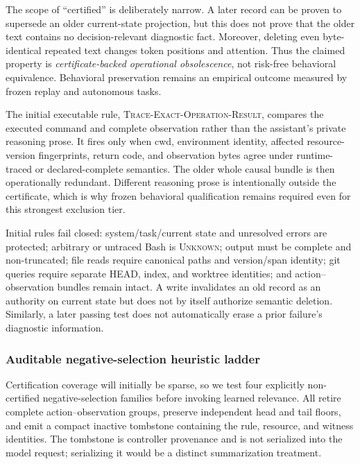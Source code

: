 \documentclass[11pt]{article}
\begin{document}
The scope of ``certified'' is deliberately narrow. A later record can be proven
to supersede an older current-state projection, but this does not prove that the
older text contains no decision-relevant diagnostic fact. Moreover, deleting
even byte-identical repeated text changes token positions and attention. Thus
the claimed property is \emph{certificate-backed operational obsolescence},
not risk-free behavioral equivalence. Behavioral preservation remains an
empirical outcome measured by frozen replay and autonomous tasks.

The initial executable rule, \textsc{Trace-Exact-Operation-Result}, compares the
executed command and complete observation rather than the assistant's private
reasoning prose.  It fires only when cwd, environment identity, affected
resource-version fingerprints, return code, and observation bytes agree under
runtime-traced or declared-complete semantics.  The older whole causal bundle
is then operationally redundant.  Different reasoning prose is intentionally
outside the certificate, which is why frozen behavioral qualification remains
required even for this strongest exclusion tier.

Initial rules fail closed: system/task/current state and unresolved errors are
protected; arbitrary or untraced Bash is \textsc{Unknown}; output must be
complete and non-truncated; file reads require canonical paths and version/span
identity; git queries require separate HEAD, index, and worktree identities;
and action--observation bundles remain intact. A write invalidates an old record
as an authority on current state but does not by itself authorize semantic
deletion. Similarly, a later passing test does not automatically erase a prior
failure's diagnostic information.

\subsubsection{Auditable negative-selection heuristic ladder}

Certification coverage will initially be sparse, so we test four explicitly
non-certified negative-selection families before invoking learned relevance.
All retire complete action--observation groups, preserve independent head and
tail floors, and emit a compact inactive tombstone containing the rule,
resource, and witness identities. The tombstone is controller provenance and
is not serialized into the model request; serializing it would be a distinct
summarization treatment.
\end{document}
